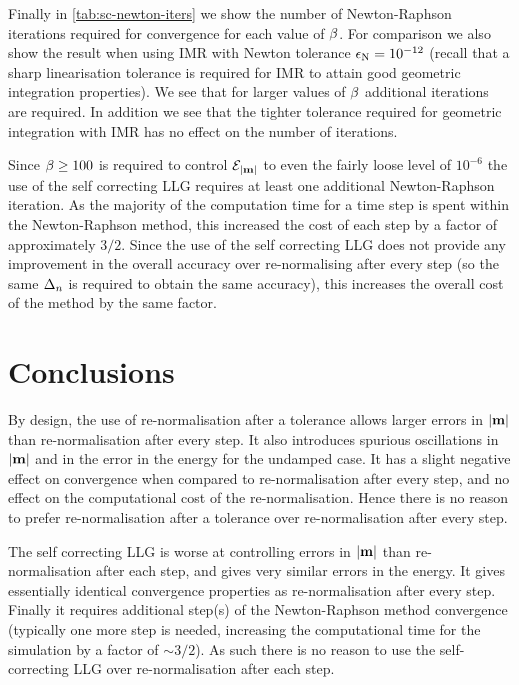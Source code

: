 Finally in \cref{tab:sc-newton-iters} we show the number of Newton-Raphson iterations required for convergence for each value of $\beta$.
For comparison we also show the result when using IMR with Newton tolerance $\epsilon_{\mathrm{N}}=10^{-12}$ (recall that a sharp linearisation tolerance is required for IMR to attain good geometric integration properties).
We see that for larger values of $\beta$ additional iterations are required.
In addition we see that the tighter tolerance required for geometric integration with IMR has no effect on the number of iterations.

Since $\beta \geq 100$ is required to control $\mathcal{E}_{\left|{\boldsymbol{\mathrm{m}}} \right|}$ to even the fairly loose level of $10^{-6}$ the use of the self correcting LLG requires at least one additional Newton-Raphson iteration.
As the majority of the computation time for a time step is spent within the Newton-Raphson method, this increased the cost of each step by a factor of approximately $3/2$.
Since the use of the self correcting LLG does not provide any improvement in the overall accuracy over re-normalising after every step (so the same $\Delta_{n}$ is required to obtain the same accuracy), this increases the overall cost of the method by the same factor.


\section{Conclusions}

By design, the use of re-normalisation after a tolerance allows larger errors in $\left|{\boldsymbol{\mathrm{m}}} \right|$ than re-normalisation after every step.
It also introduces spurious oscillations in $\left|{\boldsymbol{\mathrm{m}}} \right|$ and in the error in the energy for the undamped case.
It has a slight negative effect on convergence when compared to re-normalisation after every step, and no effect on the computational cost of the re-normalisation.
Hence there is no reason to prefer re-normalisation after a tolerance over re-normalisation after every step.

The self correcting LLG is worse at controlling errors in $\left|{\boldsymbol{\mathrm{m}}} \right|$ than re-normalisation after each step, and gives very similar errors in the energy.
It gives essentially identical convergence properties as re-normalisation after every step.
Finally it requires additional step(s) of the Newton-Raphson method convergence (typically one more step is needed, increasing the computational time for the simulation by a factor of $\sim 3/2$).
As such there is no reason to use the self-correcting LLG over re-normalisation after each step.



